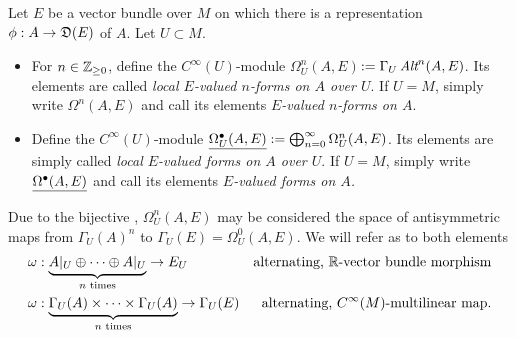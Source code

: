 \begin{definition}
Let $E$ be a vector bundle over $M$ on which there is a representation $\phi: A \to \alg D(E)$ of $A$. Let $U \subset M$.

    \begin{itemize}
    
    \item For $n \in \mathbb{Z}_{\geq 0}$, define the $C^\infty(U)$-module \emph{$\Omega_U^n(A, E)$}$:= \Gamma_U\operatorname{\textit{Alt}}^n(A, E)$. Its elements are called \emph{local $E$-valued $n$-forms on $A$ over $U$}. If $U = M$, simply write \emph{$\Omega^n(A, E)$} and call its elements \emph{$E$-valued $n$-forms on $A$}.
    
    \item Define the $C^\infty(U)$-module $\emph{\Omega_U^\bullet(A, E)} := \bigoplus^\infty_{n = 0} \Omega_U^n(A, E)$. Its elements are simply called \emph{local $E$-valued forms on $A$ over $U$}. If $U = M$, simply write $\emph{\Omega^\bullet(A, E)}$ and call its elements \emph{$E$-valued forms on $A$.}
    
    
        
    \end{itemize}
    
\end{definition}

\begin{remark}
Due to the bijective , $\Omega_U^n(A, E)$ may be considered the space of  antisymmetric maps from $\Gamma_U(A)^n$ to $\Gamma_U(E) = \Omega_U^0(A, E)$. We will refer as  to both elements
\begin{align}
    \omega &: \underbrace{A|_U \oplus \cdots \oplus A|_U}_{\text{$n$ times}} \to E_U & \text{alternating, $\mathbb{R}$-vector bundle morphism}\\
    \omega &: \underbrace{\Gamma_U(A) \times \cdots \times \Gamma_U(A)}_{\text{$n$ times}} \to \Gamma_U(E) & \text{alternating, $C^\infty(M)$-multilinear map}.
\end{align}
    
    
\end{remark}

